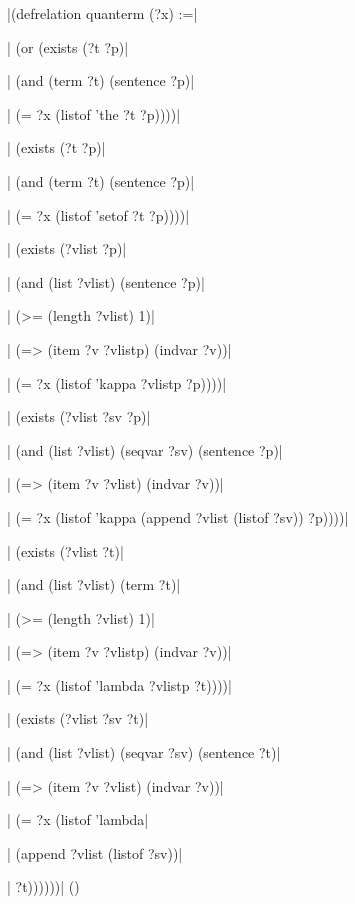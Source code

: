 \medskip
\verbatim|(defrelation quanterm (?x) :=|\par
\verbatim|  (or (exists (?t ?p)|\par
\verbatim|        (and (term ?t) (sentence ?p)|\par
\verbatim|             (= ?x (listof 'the ?t ?p))))|\par
\verbatim|      (exists (?t ?p)|\par
\verbatim|        (and (term ?t) (sentence ?p)|\par
\verbatim|             (= ?x (listof 'setof ?t ?p))))|\par
\verbatim|      (exists (?vlist ?p)|\par
\verbatim|        (and (list ?vlist) (sentence ?p)|\par
\verbatim|             (>= (length ?vlist) 1)|\par
\verbatim|             (=> (item ?v ?vlistp) (indvar ?v))|\par
\verbatim|             (= ?x (listof 'kappa ?vlistp ?p))))|\par
\verbatim|      (exists (?vlist ?sv ?p)|\par
\verbatim|        (and (list ?vlist) (seqvar ?sv) (sentence ?p)|\par
\verbatim|             (=> (item ?v ?vlist) (indvar ?v))|\par
\verbatim|             (= ?x (listof 'kappa (append ?vlist (listof ?sv)) ?p))))|\par
\verbatim|      (exists (?vlist ?t)|\par
\verbatim|        (and (list ?vlist) (term ?t)|\par
\verbatim|             (>= (length ?vlist) 1)|\par
\verbatim|             (=> (item ?v ?vlistp) (indvar ?v))|\par
\verbatim|             (= ?x (listof 'lambda ?vlistp ?t))))|\par
\verbatim|      (exists (?vlist ?sv ?t)|\par
\verbatim|        (and (list ?vlist) (seqvar ?sv) (sentence ?t)|\par
\verbatim|             (=> (item ?v ?vlist) (indvar ?v))|\par
\verbatim|             (= ?x (listof 'lambda|\par
\verbatim|                           (append ?vlist (listof ?sv))|\par
\verbatim|                           ?t))))))|
\hfill(\equation)\par
\medskip

